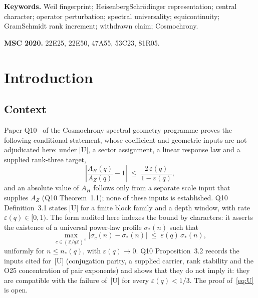 \documentclass[12pt,a4paper]{article}
\theoremstyle{definition}
\theoremstyle{remark}
\begin{document}
  \bigskip
  \noindent\textbf{Keywords.}
  Weil fingerprint; Heisenberg\textendash Schr\"odinger representation; central character;
  operator perturbation;
  spectral universality; equicontinuity; Gram\textendash Schmidt rank increment;
  withdrawn claim; Cosmochrony.

  \noindent\textbf{MSC 2020.}
  22E25, 22E50, 47A55, 53C23, 81R05.

  \clearpage
  \tableofcontents
  \clearpage

  \section{Introduction}

    \subsection{Context}

      Paper Q10~\cite{Beau2026q10} of the Cosmochrony spectral geometry programme proves the
      following conditional statement, whose coefficient and geometric inputs are not adjudicated
      here: under [U], a sector assignment, a linear response law and a supplied rank-three target,
      \begin{equation}\label{eq:isotropy-chain}
        \left|\frac{A_H(q)}{A_Z(q)} - 1\right| \;\leq\; \frac{2\,\varepsilon(q)}{1 - \varepsilon(q)},
      \end{equation}
      and an absolute value of $A_H$ follows only from a separate scale input that supplies $A_Z$
      (Q10 Theorem~1.1); none of these inputs is established.
      Q10 Definition~3.1 states [U] for a finite block family and a depth window, with rate
      $\varepsilon(q) \in [0,1)$.
      The form audited here indexes the bound by characters: it asserts the existence of a universal
      power-law profile $\sigma_*(n)$ such that
      \begin{equation}\label{eq:U}
        \max_{c \in (\mathbb{Z}/q\mathbb{Z})^\times}
        |\sigma_c(n) - \sigma_*(n)| \;\leq\; \varepsilon(q)\,\sigma_*(n),
      \end{equation}
      uniformly for $n \leq n_*(q)$, with $\varepsilon(q) \to 0$.
      Q10 Proposition~3.2 records the inputs cited for~[U] (conjugation parity, a supplied
      carrier, rank stability and the O25 concentration of pair exponents) and shows that they do
      not imply it: they are compatible with the failure of~[U] for every $\varepsilon(q) < 1/3$.
      The proof of~\eqref{eq:U} is open.
\end{document}
